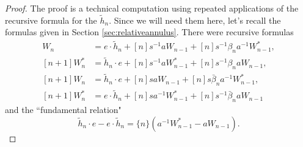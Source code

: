 \begin{proof}
The proof is a technical computation using repeated applications of the recursive formula for the $\tilde{h}_n$. Since we will need them here, let's recall the formulas given in Section \ref{sec:relativeannulus}. There were recursive formulas
\begin{align}
[n+1] W_n &= e \cdot \tilde{h}_n + [n] s^{-1} a W_{n-1} + [n] s^{-1} \beta_n a^{-1} W^*_{n-1}, \label{eq:r1} \\
[n+1] W^*_n &= \tilde{h}_n \cdot e + [n] s^{-1} a W^*_{n-1} + [n] s^{-1} \beta_n a W_{n-1}, \label{eq:r2} \\
[n+1] W_n &= \tilde{h}_n \cdot e + [n] s a W_{n-1} + [n] s \bar{\beta}_n a^{-1} W^*_{n-1}, \label{eq:r3} \\
[n+1] W^*_n &= e \cdot \tilde{h}_n + [n] s a^{-1} W^*_{n-1} + [n] s^{-1} \bar{\beta}_n a W_{n-1} \label{eq:r4}
\end{align}
and the ``fundamental relation"
\begin{equation}
\tilde{h}_n \cdot e - e \cdot \tilde{h}_n = \{n\} (a^{-1} W^*_{n-1} - a W_{n-1}).
\end{equation}



\end{proof}
